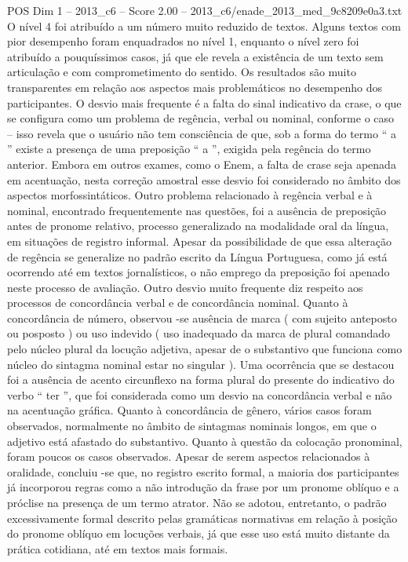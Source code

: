 \begin{textsample}{POS Dim 1 – 2013\_c6 – Score 2.00 – 2013\_c6/enade\_2013\_med\_9c8209e0a3.txt}
O nível 4 foi atribuído a um número muito reduzido de textos.
Alguns textos com pior desempenho foram enquadrados no nível 1, enquanto o nível zero foi atribuído a pouquíssimos casos, já que ele revela a existência de um texto sem articulação e com comprometimento do sentido.
Os resultados são muito transparentes em relação aos aspectos mais problemáticos no desempenho dos participantes.
O desvio mais frequente é a falta do sinal indicativo da crase, o que se configura como um problema de regência, verbal ou nominal, conforme o caso – isso revela que o usuário não tem consciência de que, sob a forma do termo “ a ” existe a presença de uma preposição “ a ”, exigida pela regência do termo anterior.
Embora em outros exames, como o Enem, a falta de crase seja apenada em acentuação, nesta correção amostral esse desvio foi considerado no âmbito dos aspectos morfossintáticos.
Outro problema relacionado à regência verbal e à nominal, encontrado frequentemente nas questões, foi a ausência de preposição antes de pronome relativo, processo generalizado na modalidade oral da língua, em situações de registro informal.
Apesar da possibilidade de que essa alteração de regência se generalize no padrão escrito da Língua Portuguesa, como já está ocorrendo até em textos jornalísticos, o não emprego da preposição foi apenado neste processo de avaliação.
Outro desvio muito frequente diz respeito aos processos de concordância verbal e de concordância nominal.
Quanto à concordância de número, observou -se ausência de marca ( com sujeito anteposto ou posposto ) ou uso indevido ( uso inadequado da marca de plural comandado pelo núcleo plural da locução adjetiva, apesar de o substantivo que funciona como núcleo do sintagma nominal estar no singular ).
Uma ocorrência que se destacou foi a ausência de acento circunflexo na forma plural do presente do indicativo do verbo “ ter ”, que foi considerada como um desvio na concordância verbal e não na acentuação gráfica.
Quanto à concordância de gênero, vários casos foram observados, normalmente no âmbito de sintagmas nominais longos, em que o adjetivo está afastado do substantivo.
Quanto à questão da colocação pronominal, foram poucos os casos observados.
Apesar de serem aspectos relacionados à oralidade, concluiu -se que, no registro escrito formal, a maioria dos participantes já incorporou regras como a não introdução da frase por um pronome oblíquo e a próclise na presença de um termo atrator.
Não se adotou, entretanto, o padrão excessivamente formal descrito pelas gramáticas normativas em relação à posição do pronome oblíquo em locuções verbais, já que esse uso está muito distante da prática cotidiana, até em textos mais formais.

\end{textsample}
